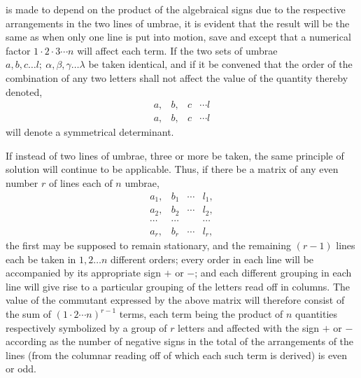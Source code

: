 \documentclass[11pt]{article}
\newcommand{\sourcepage}[1]{\marginpar{\scriptsize p.~#1}}
\begin{document}
{{\sourcepage{306}
is made to depend on the product of the algebraical signs due to the respective arrangements in the two lines of umbrae, it is evident that the result will be the same as when only one line is put into motion, save and except that a numerical factor $1\cdot2\cdot3\cdots n$ will affect each term. If the two sets of umbrae $a,b,c\ldots l;\ \alpha,\beta,\gamma\ldots\lambda$ be taken identical, and if it be convened that the order of the combination of any two letters shall not affect the value of the quantity thereby denoted,
\[
\begin{array}{cccc}
a,&b,&c&\cdots l\\
a,&b,&c&\cdots l
\end{array}
\]
will denote a symmetrical determinant.

If instead of two lines of umbrae, three or more be taken, the same principle of solution will continue to be applicable. Thus, if there be a matrix of any even number $r$ of lines each of $n$ umbrae,
\[
\begin{array}{cccc}
a_1,&b_1&\cdots&l_1,\\
a_2,&b_2&\cdots&l_2,\\
\cdots&\cdots&&\cdots\\
a_r,&b_r&\cdots&l_r,
\end{array}
\]
the first may be supposed to remain stationary, and the remaining $(r-1)$ lines each be taken in $1,2\ldots n$ different orders; every order in each line will be accompanied by its appropriate sign $+$ or $-$; and each different grouping in each line will give rise to a particular grouping of the letters read off in columns. The value of the commutant expressed by the above matrix will therefore consist of the sum of $(1\cdot2\cdots n)^{r-1}$ terms, each term being the product of $n$ quantities respectively symbolized by a group of $r$ letters and affected with the sign $+$ or $-$ according as the number of negative signs in the total of the arrangements of the lines (from the columnar reading off of which each such term is derived) is even or odd.

}}
\end{document}
